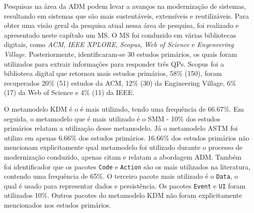 Pesquisas na área da ADM podem levar a avanços na modernização de sistemas, resultando em sistemas que são mais sustentáveis, extensíveis e reutilizáveis. Para obter uma visão geral da pesquisa atual nessa área de pesquisa, foi realizado e apresentado neste capítulo um MS. O MS foi conduzido em várias bibliotecas digitais, como \textit{ACM}, \textit{IEEE XPLORE}, \textit{Scopus}, \textit{Web of Science} e \textit{Engeneering Village}. Posteriormente, identificaram-se 30 estudos primários, os quais foram utilizados para extrair informações para responder três QPs. Scopus foi a biblioteca digital que retornou mais estudos primários, 58\% (150), foram recuperados 20\% (51) estudos da ACM, 12\% (30) da Engineering Village, 6\% (17) da Web of Science e 4\% (11) da IEEE. 

O metamodelo KDM é o é mais utilizado, tendo uma frequência de 66.67\%. Em seguida, o metamodelo que é mais utilizado é o SMM - 10\% dos estudos primários relatam a utilização desse metamodelo. Já o metamodelo ASTM foi utilizo em apenas 6.66\% dos estudos primários. 16.66\% dos estudos primários não mencionam explicitamente qual metamodelo foi utilizado durante o processo de modernização conduzido, apenas citam e relatam a abordagem ADM. Também foi identificador que os pacotes \texttt{Code} e \texttt{Action} são os mais utilizados na literatura, contendo uma frequência de 65\%. O terceiro pacote mais utilizado é o \texttt{Data}, o qual é usado para representar dados e persistência. Os pacotes \texttt{Event} e \texttt{UI} foram utilizados 10\%. Outros pacotes do metamodelo KDM não foram explicitamente mencionados nos estudos primários.

